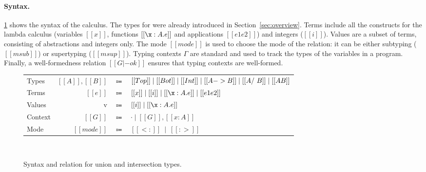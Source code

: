 \paragraph{Syntax.}
\cref{fig:subtyping2} shows the syntax of the calculus. The types for \ui were already introduced
in Section~\ref{sec:overview}. Terms include all the constructs for the lambda calculus
(variables $[[x]]$, functions $[[\x : A . e]]$ and applications $[[e1 e2]]$) and integers ($[[i]]$).
Values are a subset of terms, consisting of abstractions and integers only.
The mode $[[mode]]$ is used to choose the mode of the relation:
it can be either subtyping ($[[msub]]$) or supertyping ($[[msup]]$).
Typing contexts $\Gamma$ are standard and used to track the types
of the variables in a program. Finally, a well-formedness relation $[[G |- ok]]$ ensures
that typing contexts are well-formed.


\begin{figure}[t]
  \begin{small}
    \centering
    \begin{tabular}{lrcl} \toprule
      Types & $[[A]], [[B]]$ & $\Coloneqq$ & $ [[Top]] \mid [[Bot]] \mid [[Int]] \mid [[A -> B]] \mid [[A /\ B]] \mid [[A \/ B]] $ \\
      Terms & $[[e]]$ & $\Coloneqq$ & $ [[x]]  \mid [[i]]  \mid [[\x : A . e]] \mid [[e1 e2]] $ \\
      Values & v & $\Coloneqq$ & $  [[i]] \mid [[\x : A . e]] $ \\
      Context & $[[G]]$ & $\Coloneqq$ & $ \cdot  \mid [[G]] , [[x : A]] $ \\
      Mode & $[[mode]]$  & $\Coloneqq$ & $[[<:]] \ \mid \ [[:>]]$ \\
      \bottomrule
    \end{tabular}
  \end{small}\\
  \begin{small}
    \centering
  \end{small}
  \caption{Syntax and \nameduo relation for union and intersection types.}
  \label{fig:subtyping2}
\end{figure}




